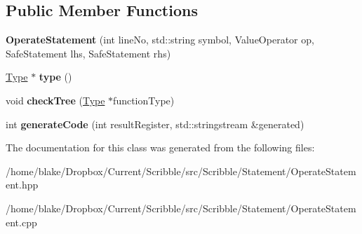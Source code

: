 \subsection*{Public Member Functions}
\begin{DoxyCompactItemize}
\item 
\hypertarget{class_scribble_core_1_1_operate_statement_aeaa7a8e70841591749c313980e7ef134}{{\bfseries Operate\-Statement} (int line\-No, std\-::string symbol, Value\-Operator op, Safe\-Statement lhs, Safe\-Statement rhs)}\label{class_scribble_core_1_1_operate_statement_aeaa7a8e70841591749c313980e7ef134}

\item 
\hypertarget{class_scribble_core_1_1_operate_statement_a1b5522b9d5b626de71a61a7538646a23}{\hyperlink{class_scribble_core_1_1_type}{Type} $\ast$ {\bfseries type} ()}\label{class_scribble_core_1_1_operate_statement_a1b5522b9d5b626de71a61a7538646a23}

\item 
\hypertarget{class_scribble_core_1_1_operate_statement_ac89a46ee8331ba0afa3ff86ae7a5c94e}{void {\bfseries check\-Tree} (\hyperlink{class_scribble_core_1_1_type}{Type} $\ast$function\-Type)}\label{class_scribble_core_1_1_operate_statement_ac89a46ee8331ba0afa3ff86ae7a5c94e}

\item 
\hypertarget{class_scribble_core_1_1_operate_statement_a2bb1867e6502a5118d580f803dd82e40}{int {\bfseries generate\-Code} (int result\-Register, std\-::stringstream \&generated)}\label{class_scribble_core_1_1_operate_statement_a2bb1867e6502a5118d580f803dd82e40}

\end{DoxyCompactItemize}


The documentation for this class was generated from the following files\-:\begin{DoxyCompactItemize}
\item 
/home/blake/\-Dropbox/\-Current/\-Scribble/src/\-Scribble/\-Statement/Operate\-Statement.\-hpp\item 
/home/blake/\-Dropbox/\-Current/\-Scribble/src/\-Scribble/\-Statement/Operate\-Statement.\-cpp\end{DoxyCompactItemize}
